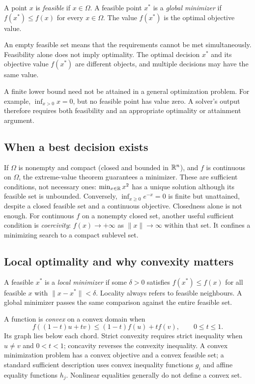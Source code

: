 \documentclass[11pt,a4paper]{article}
\begin{document}
\begin{definition}\label{def:optimal}
  A point $x$ is \emph{feasible} if $x\in\Omega$. A feasible point $x^*$ is a
  \emph{global minimizer} if $f(x^*)\leq f(x)$ for every $x\in\Omega$.
  The value $f(x^*)$ is the optimal objective value.
\end{definition}
An empty feasible set means that the requirements cannot be met simultaneously.
Feasibility alone does not imply optimality. The optimal decision $x^*$ and its
objective value $f(x^*)$ are different objects, and multiple decisions may have
the same value.

\begin{remark}
  A finite lower bound need not be attained in a general optimization problem.
  For example, $\inf_{x>0}x=0$, but no feasible point has value zero.
  A solver's output therefore requires both feasibility and an appropriate
  optimality or attainment argument.
\end{remark}

\subsection{When a best decision exists}
If $\Omega$ is nonempty and compact (closed and bounded in $\mathbb{R}^n$), and $f$
is continuous on $\Omega$, the extreme-value theorem guarantees a minimizer.
These are sufficient conditions, not necessary ones: $\min_{x\in\mathbb{R}}x^2$ has
a unique solution although its feasible set is unbounded. Conversely,
$\inf_{x\geq0}e^{-x}=0$ is finite but unattained, despite a closed feasible
set and a continuous objective. Closedness alone is not enough.
For continuous $f$ on a nonempty closed set, another useful sufficient condition
is \emph{coercivity}: $f(x)\to+\infty$ as $\|x\|\to\infty$ within that set.
It confines a minimizing search to a compact sublevel set.

\subsection{Local optimality and why convexity matters}\label{sec:local-convex}
A feasible $x^*$ is a \emph{local minimizer} if some $\delta>0$ satisfies
$f(x^*)\leq f(x)$ for all feasible $x$ with $\|x-x^*\|<\delta$.
Locality always refers to feasible neighbours. A global minimizer passes the
same comparison against the entire feasible set.

A function is \emph{convex} on a convex domain when
\[
  f((1-t)u+tv)\leq(1-t)f(u)+tf(v),\qquad 0\leq t\leq1.
\]
Its graph lies below each chord. Strict convexity requires strict inequality
when $u\ne v$ and $0<t<1$; concavity reverses the convexity inequality.
A convex minimization problem has a convex objective and a convex feasible set; a standard sufficient description uses
convex inequality functions $g_i$ and affine equality functions $h_j$.
Nonlinear equalities generally do not define a convex set.
\end{document}

